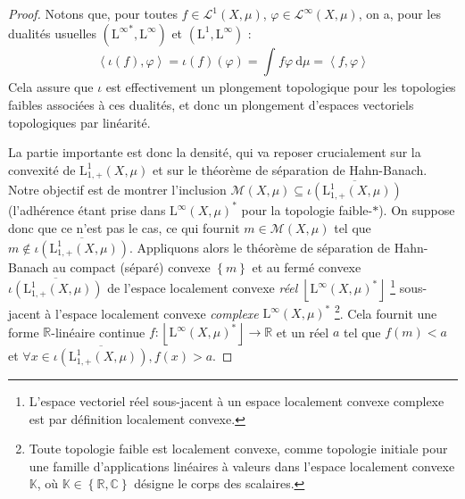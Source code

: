 \documentclass[a4paper,12pt]{article}
\newcommand{\R}{\mathbb{R}}
\newcommand{\C}{\mathbb{C}}
\newcommand{\K}{\mathbb{K}}
\newcommand{\ket}[1]{\left\langle #1 \right\rangle}
\newcommand{\floor}[1]{\left\lfloor #1 \right\rfloor}
\newcommand{\set}[1]{\left\{ #1 \right\}}
\newcommand{\integral}[4]{\int_{#1}^{#2} #3~\mathrm{d}#4}
\newcommand{\closure}[1]{\overline{#1}}
\begin{document}
\begin{proof}
    Notons que, pour toutes $f\in\mathscr{L}^1(X, \mu)$, $\varphi\in\mathscr{L}^\infty(X, \mu)$, on a, pour les dualités usuelles 
    $({\mathrm{L}^\infty}^*, \mathrm{L}^\infty)$ et $(\mathrm{L}^1, \mathrm{L}^\infty)$ :
    \begin{equation*}
        \ket{\iota(f), \varphi} = \iota(f)(\varphi) = \integral{}{}{f\varphi}{\mu} = \ket{f, \varphi}
    \end{equation*}
    Cela assure que $\iota$ est effectivement un plongement topologique pour les topologies faibles associées à ces dualités,
    et donc un plongement d'espaces vectoriels topologiques par linéarité.

    La partie importante est donc la densité, qui va reposer crucialement sur la convexité de $\mathrm{L}^1_{1, +}(X, \mu)$ et sur le théorème de séparation de Hahn-Banach.
    Notre objectif est de montrer l'inclusion $\mathcal{M}(X, \mu)\subseteq\closure{\iota(\mathrm{L}^1_{1, +}(X, \mu))}$ (l'adhérence étant prise dans 
    ${\mathrm{L}^\infty(X,\mu)}^*$ pour la topologie faible-$*$). On suppose donc que ce n'est pas le cas, ce qui fournit
    $m\in\mathcal{M}(X, \mu)$ tel que $m\notin\closure{\iota(\mathrm{L}^1_{1, +}(X, \mu))}$. Appliquons alors le théorème de séparation de
    Hahn-Banach au compact (séparé) convexe $\set{m}$ et au fermé convexe $\closure{\iota(\mathrm{L}^1_{1, +}(X, \mu))}$
    de l'espace localement convexe \emph{réel} $\floor{\mathrm{L}^\infty(X,\mu)^*}$
    \footnote{L'espace vectoriel réel sous-jacent à un espace localement convexe complexe
    est par définition localement convexe. } 
    sous-jacent à l'espace localement convexe \emph{complexe} $\mathrm{L}^\infty(X,\mu)^*$
    \footnote{Toute topologie faible est localement convexe, comme topologie initiale 
    pour une famille d'applications linéaires à valeurs dans l'espace localement convexe $\K$, où $\K\in\set{\R, \C}$ 
    désigne le corps des scalaires. }. 
    Cela fournit une forme $\R$-linéaire continue $f : \floor{\mathrm{L}^\infty(X,\mu)^*} \to \R$ et un réel 
    $a$ tel que $f(m)<a$ et $\forall x\in \closure{\iota(\mathrm{L}^1_{1, +}(X, \mu))}, f(x)>a$. 


\end{proof}
\end{document}
